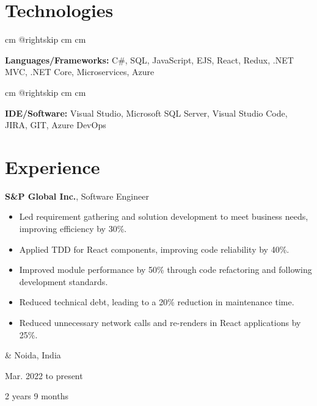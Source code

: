 \documentclass[10pt, letterpaper]{article}
\newenvironment{highlights}{
        \begin{itemize}[
                topsep=0pt,
                parsep=0.10 cm,
                partopsep=0pt,
                itemsep=0pt,
                after=\vspace{-1\baselineskip},
                leftmargin=0.4 cm + 3pt
            ]
    }{
        \end{itemize}
    } %
\let\originalTabularx\tabularx
\let\originalEndTabularx\endtabularx
\renewenvironment{tabularx}{\bgroup\centering\originalTabularx}{\originalEndTabularx\par\egroup}
\begin{document}
    
    \section{Technologies}

        \begingroup{} cm
        \advance\csname @rightskip cm
        \advance{} cm

        \textbf{Languages/Frameworks:} C\#, SQL, JavaScript, EJS, React, Redux, .NET MVC, .NET Core, Microservices, Azure \par\endgroup

        \vspace{0.2 cm}
        \begingroup{} cm
        \advance\csname @rightskip cm
        \advance{} cm

        \textbf{IDE/Software:} Visual Studio, Microsoft SQL Server, Visual Studio Code, JIRA, GIT, Azure DevOps \par\endgroup


    
    \section{Experience}

        \begin{tabularx}{
            \textwidth-0.4 cm-0.13cm
        }{
            K{0.2 cm}
            R{4.1 cm}
        }
            \textbf{S\&P Global Inc.}, Software Engineer

            \vspace{0.10 cm}

            \begin{highlights}
                \item Led requirement gathering and solution development to meet business needs, improving efficiency by 30\%.
                \item Applied TDD for React components, improving code reliability by 40\%.
                \item Improved module performance by 50\% through code refactoring and following development standards.
                \item Reduced technical debt, leading to a 20\% reduction in maintenance time.
                \item Reduced unnecessary network calls and re-renders in React applications by 25\%.
            \end{highlights}
            &
            Noida, India

            Mar. 2022 to present

            2 years 9 months
        \end{tabularx}
\end{document}
